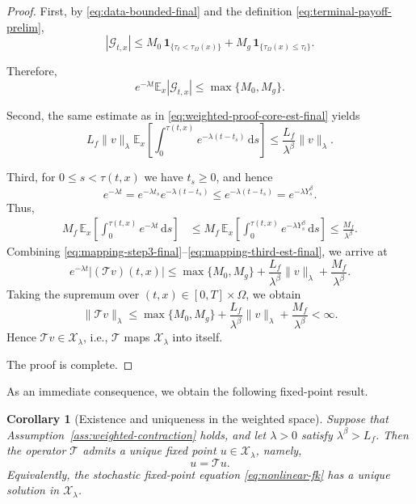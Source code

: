 \documentclass[a4paper,fleqn]{cas-sc}
\newtheorem{corollary}{Corollary}
\begin{document}
\begin{proof}
First, by \eqref{eq:data-bounded-final} and the definition \eqref{eq:terminal-payoff-prelim},
\[
|\mathcal{G}_{t,x}|
\le
M_0\,\mathbf{1}_{\{\tau_t<\tau_\Omega(x)\}}
+
M_g\,\mathbf{1}_{\{\tau_\Omega(x)\le \tau_t\}}.
\]

Therefore,
\begin{equation}\label{eq:terminal-est-final}
e^{-\lambda t}\mathbb{E}_x|\mathcal{G}_{t,x}|
\le
\max\{M_0,M_g\}.
\end{equation}

Second, the same estimate as in \eqref{eq:weighted-proof-core-est-final} yields
\begin{equation}\label{eq:mapping-second-est-final}
L_f\|v\|_\lambda
\mathbb{E}_x\!\left[
\int_0^{\tau(t,x)}
e^{-\lambda(t-t_s)}\,\mathrm{d}s
\right]
\le
\frac{L_f}{\lambda^\beta}\|v\|_\lambda.
\end{equation}

Third, for $0\le s<\tau(t,x)$ we have $t_s\ge 0$, and hence
\[
e^{-\lambda t}
=
e^{-\lambda t_s}e^{-\lambda(t-t_s)}
\le
e^{-\lambda(t-t_s)}
=
e^{-\lambda Y_s^\beta}.
\]
Thus,
\begin{align}
M_f\,
\mathbb{E}_x\!\left[
\int_0^{\tau(t,x)} e^{-\lambda t}\,\mathrm{d}s
\right]
&\le
M_f\,
\mathbb{E}_x\!\left[
\int_0^{\tau(t,x)} e^{-\lambda Y_s^\beta}\,\mathrm{d}s
\right]
\le
\frac{M_f}{\lambda^\beta}.
\label{eq:mapping-third-est-final}
\end{align}
Combining \eqref{eq:mapping-step3-final}--\eqref{eq:mapping-third-est-final}, we arrive at
\[
e^{-\lambda t}|(\mathcal{T}v)(t,x)|
\le
\max\{M_0,M_g\}
+
\frac{L_f}{\lambda^\beta}\|v\|_\lambda
+
\frac{M_f}{\lambda^\beta}.
\]
Taking the supremum over $(t,x)\in[0,T]\times\Omega$, we obtain
\begin{equation}\label{eq:mapping-bound-final}
\|\mathcal{T}v\|_\lambda
\le
\max\{M_0,M_g\}
+
\frac{L_f}{\lambda^\beta}\|v\|_\lambda
+
\frac{M_f}{\lambda^\beta}
<\infty.
\end{equation}
Hence $\mathcal{T}v\in\mathcal{X}_\lambda$, i.e., $\mathcal{T}$ maps $\mathcal{X}_\lambda$ into itself.

The proof is complete.
\end{proof}

As an immediate consequence, we obtain the following fixed-point result.

\begin{corollary}[Existence and uniqueness in the weighted space]
\label{cor:weighted-fixed-point}
Suppose that Assumption~\ref{ass:weighted-contraction} holds, and let $\lambda>0$ satisfy $\lambda^\beta>L_f$. Then the operator $\mathcal{T}$ admits a unique fixed point $u\in\mathcal{X}_\lambda$, namely,
\[
u=\mathcal{T}u.
\]
Equivalently, the stochastic fixed-point equation \eqref{eq:nonlinear-fk}
has a unique solution in $\mathcal{X}_\lambda$.
\end{corollary}
\end{document}
